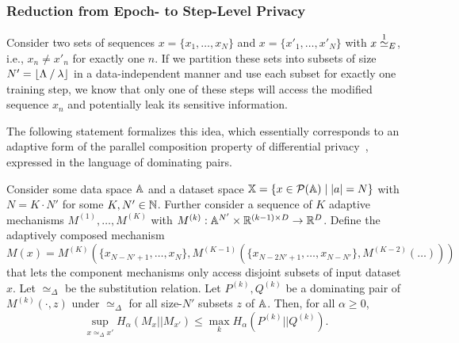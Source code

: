 \subsubsection{Reduction from Epoch- to Step-Level Privacy}\label{appendix:proofs_bottom_epoch_to_step}
Consider two sets of sequences $x = \{x_1,\dots,x_N\}$ and $x = \{x'_1,\dots,x'_N\}$
with $x \overset{1}{\simeq}_{E}$, i.e., $x_n \neq x'_n$ for exactly one $n$.
If we partition these sets into subsets of size $N' = \lfloor \Lambda \mathbin{/} \lambda \rfloor$ in a data-independent manner and use each subset for exactly one training step,
we know that only one of these steps will access the modified sequence $x_n$ and potentially leak its sensitive information.

The following statement formalizes this idea, which essentially corresponds to an adaptive form of the parallel composition property of differential privacy~\cite{mcsherry2009privacy}, expressed in the language of dominating pairs.
\begin{lemma}\label{lemma:adaptive_parallel_composition}
    Consider some data space ${\mathbb{A}}$ and
    a dataset space ${\mathbb{X}} = \{x \in \mathcal{P}({\mathbb{A}}) \mid |a| = N\}$
    with $N = K \cdot N'$ for some $K, N' \in {\mathbb{N}}$. 
    Further consider a sequence of $K$ adaptive mechanisms $M^{(1)},\dots,M^{(K)}$ with 
    $M^{(k)} :  {\mathbb{A}}^{N'} \times {\mathbb{R}}^{(k-1) \times D} \rightarrow {\mathbb{R}}^D$.
    Define the adaptively composed mechanism
    \begin{equation*}
        M(x) = M^{(K)}\left(\{x_{N - N' + 1}, \dots, x_{N}\},
                  M^{(K-1)}\left(\{x_{N - 2N' + 1},\dots, x_{N - N'} \}, M^{(K-2)}(\dots)\right)\right)
    \end{equation*} that lets the component mechanisms only access disjoint subsets of input dataset $x$.
    Let $\simeq_\Delta$ be the substitution relation.
    Let $P^{(k)},Q^{(k)}$ be a dominating pair of
    $M^{(k)}(\cdot, z)$ under $\simeq_\Delta$ for all size-$N'$ subsets $z$ of ${\mathbb{A}}$. Then, for all $\alpha \geq 0$, 
    \begin{equation}\label{eq:adaptive_parallel_composition}
        \sup_{x \simeq_\Delta x'} H_\alpha(M_x || M_{x'}) \leq 
        \max_k H_\alpha(P^{(k)} || Q^{(k)}).
    \end{equation}
\end{lemma}
